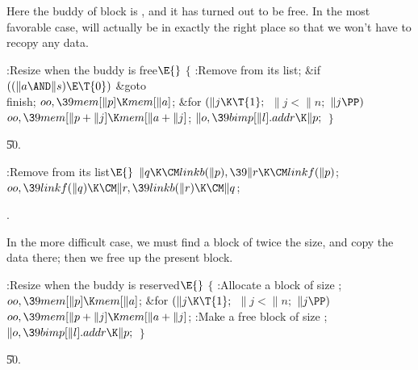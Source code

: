 Here the buddy of block  is , and it has
turned out to be free.
In the most favorable case,  will actually be in exactly the right
place so
that we won't have to recopy any data.

\Y\B\4:Resize when the buddy is free\X${}\E{}$\6
${}\{{}$\1\6
:Remove  from its  list\X;\6
\&{if} ${}((\|a\AND\|s)\E\T{0}){}$\1\5
\&{goto} \\{finish};\2\6
${}\\{oo},\39\\{mem}[\|p]\K\\{mem}[\|a]{}$;\6
\&{for} ${}(\|j\K\T{1};{}$ ${}\|j<\|n;{}$ ${}\|j\PP){}$\1\5
${}\\{oo},\39\\{mem}[\|p+\|j]\K\\{mem}[\|a+\|j]{}$;\2\6
${}\|o,\39\\{bimp}[\|l].\\{addr}\K\|p;{}$\6
\4${}\}{}$\2\par
\U50.\fi

\B{}:Remove  from its  list\X${}%
\E{}$\6
$\|q\K\CM\\{linkb}(\|p),\39\|r\K\CM\\{linkf}(\|p){}$;\6
${}\\{oo},\39\\{linkf}(\|q)\K\CM\|r,\39\\{linkb}(\|r)\K\CM\|q{}$;\par
{}.\fi

In the more difficult case, we must find a block of twice
the size,
and copy the data there; then we free up the present block.

\Y\B\4:Resize when the buddy is reserved\X${}\E{}$\6
${}\{{}$\1\6
:Allocate a block  of size \X;\6
${}\\{oo},\39\\{mem}[\|p]\K\\{mem}[\|a]{}$;\6
\&{for} ${}(\|j\K\T{1};{}$ ${}\|j<\|n;{}$ ${}\|j\PP){}$\1\5
${}\\{oo},\39\\{mem}[\|p+\|j]\K\\{mem}[\|a+\|j]{}$;\2\6
:Make  a free block of size \X;\6
${}\|o,\39\\{bimp}[\|l].\\{addr}\K\|p;{}$\6
\4${}\}{}$\2\par
\U50.\fi

